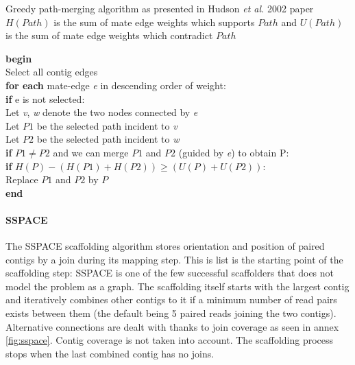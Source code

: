 \documentclass[12pt]{article}
\begin{document}
\begin{algorithm}[h!]
\caption{Greedy path-merging algorithm as presented in Hudson \textit{et al.} 2002 paper \\ \footnotesize $H(Path)$ is the sum of mate edge weights which supports $Path$ and $U(Path)$ is the sum of mate edge weights which contradict $Path$}
\textbf{begin} \\
Select all contig edges \\
\textbf{for each} mate-edge \textit{e} in descending order of weight: \\
\hspace*{1cm}\textbf{if} e is not selected: \\
\hspace*{2cm}Let \textit{v}, \textit{w} denote the two nodes connected by \textit{e} \\
\hspace*{2cm}Let $P1$ be the selected path incident to \textit{v} \\
\hspace*{2cm}Let $P2$ be the selected path incident to \textit{w} \\
\hspace*{2cm}\textbf{if} $P1 \neq P2$ and we can merge $P1$ and $P2$ (guided by \textit{e}) to obtain P: \\
\hspace*{3cm}\textbf{if} $H(P) - (H(P1) + H(P2)) \geq (U(P)+U(P2))$: \\
\hspace*{4cm}Replace $P1$ and $P2$ by $P$ \\
\textbf{end}
\end{algorithm}

\paragraph*{SSPACE}
The SSPACE scaffolding algorithm stores orientation and position of paired contigs by a join during its mapping step. This is list is the starting point of the scaffolding step: SSPACE is one of the few successful scaffolders that does not model the problem as a graph. The scaffolding itself starts with the largest contig and iteratively combines other contigs to it if a minimum number of read pairs exists between them (the default being 5 paired reads joining the two contigs). Alternative connections are dealt with thanks to join coverage as seen in annex \ref{fig:sspace}. Contig coverage is not taken into account. The scaffolding process stops when the last combined contig has no joins.
\end{document}
